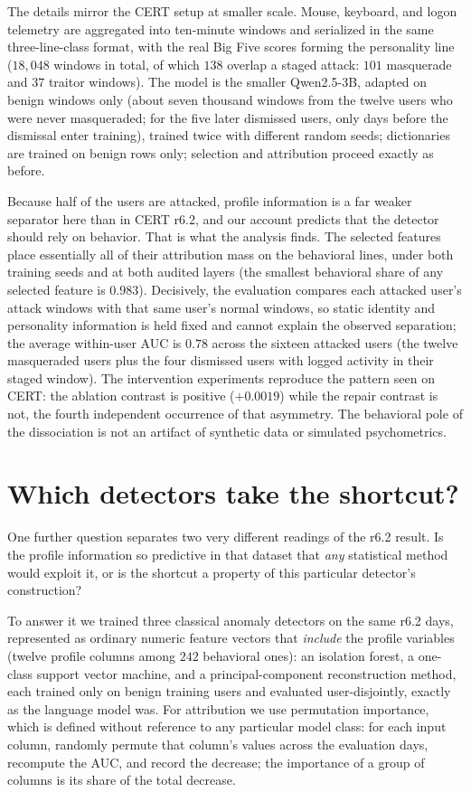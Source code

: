 \documentclass[10pt]{article}
\begin{document}
The details mirror the CERT setup at smaller scale. Mouse, keyboard,
and logon telemetry are aggregated into ten-minute windows and
serialized in the same three-line-class format, with the real Big Five
scores forming the personality line ($18{,}048$ windows in total, of
which $138$ overlap a staged attack: $101$ masquerade and $37$ traitor
windows). The model is the smaller
Qwen2.5-3B, adapted on benign windows only (about seven thousand windows
from the twelve users who were never masqueraded; for the five later
dismissed users, only days before the dismissal enter training), trained
twice with
different random seeds; dictionaries are trained on benign rows only;
selection and attribution proceed exactly as before.

Because half of the users are attacked, profile information is a far
weaker separator here than in CERT r6.2, and our account predicts that
the detector should rely on behavior. That is what the analysis finds.
The selected features place essentially all of their attribution mass
on the behavioral lines, under both training seeds and at both audited
layers (the smallest behavioral share of any selected feature is
$0.983$). Decisively, the evaluation compares each attacked user's
attack windows with that same user's normal windows, so static identity
and personality information is held fixed and cannot explain the
observed separation; the average within-user AUC is $0.78$ across the
sixteen attacked users (the twelve masqueraded users plus the four
dismissed users with logged activity in their staged window). The intervention experiments reproduce the
pattern seen on CERT: the ablation contrast is positive
($+0.0019$) while the repair contrast is not, the fourth independent
occurrence of that asymmetry. The behavioral pole of the dissociation
is not an artifact of synthetic data or simulated psychometrics.

\section{Which detectors take the shortcut?}
\label{sec:classical}

One further question separates two very different readings of the r6.2
result. Is the profile information so predictive in that dataset that
\emph{any} statistical method would exploit it, or is the shortcut a
property of this particular detector's construction?

To answer it we trained three classical anomaly detectors on the same
r6.2 days, represented as ordinary numeric feature vectors that
\emph{include} the profile variables (twelve profile columns among
$242$ behavioral ones): an isolation forest, a one-class support vector
machine, and a principal-component reconstruction method, each trained
only on benign training users and evaluated user-disjointly, exactly as
the language model was. For attribution we use permutation importance,
which is defined without reference to any particular model class: for
each input column, randomly permute that column's values across the
evaluation days, recompute the AUC, and record the decrease; the
importance of a group of columns is its share of the total decrease.
\end{document}

